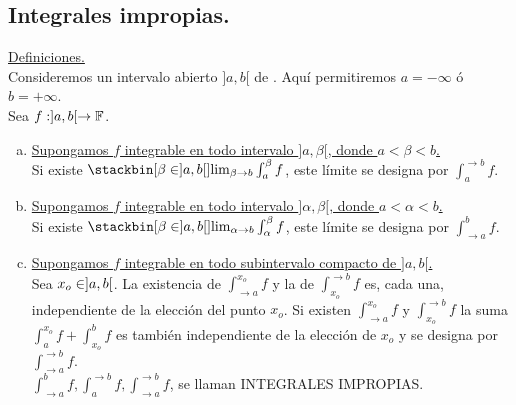 \subsection{Integrales impropias.}
\underline{Definiciones.}\\
Consideremos un intervalo abierto $]a,b[$ de \R . Aquí permitiremos $a=-\infty$ ó $b=+\infty$.\\
Sea $f:]a,b[ \rightarrow \mathbb{F}$.\\
\begin{enumerate}[a)]
\item \underline{Supongamos $f$ integrable en todo intervalo $]a,\beta[$, donde $a<\beta <b$.}\\
Si existe $ \stackbin[\beta \en ]a,b[]{}{\lim_{\beta \to b}} \int_a ^\beta f$, este límite se designa por $\int_a ^{\to b}f$. 
\item \underline{Supongamos $f$ integrable en todo intervalo $]\alpha,\beta[$, donde $a< \alpha <b$.}\\
Si existe $ \stackbin[\beta \en ]a,b[]{}{\lim_{\alpha \to b}}\int_\alpha ^\beta f$, este límite se designa por $\int_{\to a}^b f$.\\
\item \underline{Supongamos $f$ integrable en todo subintervalo compacto de $]a,b[$.}\\
Sea $x_o\in ]a,b[$. La existencia de $\int_{\to a}^{x_o}f$ y la de $\int_{x_o}^{\to b}f$ es, cada una, independiente de la elección del punto $x_o$. Si existen $\int_{\to a}^{x_o}f$ y $\int_{x_o}^{\to b}f$ la suma $\int_{a}^{x_o}f+\int_{x_o}^{b}f$ es también independiente de la elección de $x_o$ y se designa por $\int_{\to a}^{\to b}f$.\\
$\int_{\to a}^{b}f,\int_{a}^{\to b}f,\int_{\to a}^{\to b}f$, se llaman INTEGRALES IMPROPIAS.
\end{enumerate}

